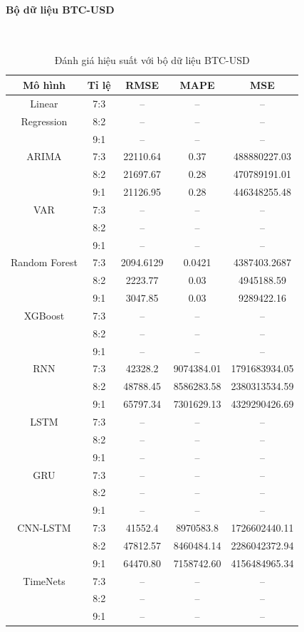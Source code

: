 \documentclass[conference]{IEEEtran}
\begin{document}
\paragraph{\textbf{Bộ dữ liệu BTC-USD}} \mbox{} \\
\begin{table}[H]
	\centering
	\caption{Đánh giá hiệu suất với bộ dữ liệu BTC-USD}
	\begin{tabular}{|c|c|c|c|c|}
		\hline
		Mô hình & Tỉ lệ & RMSE & MAPE & MSE \\ \hline
		Linear & 7:3 & -- & -- & -- \\
		Regression & 8:2 & -- & -- & -- \\
		& 9:1 & -- & -- & -- \\ \hline
		ARIMA & 7:3 & 22110.64 & 0.37 & 488880227.03 \\
		& 8:2 & 21697.67 & 0.28 & 470789191.01 \\
		& 9:1 & 21126.95 & 0.28 & 446348255.48 \\ \hline
		VAR & 7:3 & -- & -- & -- \\
		& 8:2 & -- & -- & -- \\
		& 9:1 & -- & -- & -- \\ \hline
		Random Forest & 7:3 & 2094.6129 & 0.0421 & 4387403.2687 \\
		& 8:2 & 2223.77 & 0.03 & 4945188.59 \\
		& 9:1 & 3047.85 & 0.03 & 9289422.16 \\ \hline
		XGBoost & 7:3 & -- & -- & -- \\
		& 8:2 & -- & -- & -- \\
		& 9:1 & -- & -- & -- \\ \hline
		RNN & 7:3 & 42328.2 & 9074384.01 & 1791683934.05 \\
		& 8:2 & 48788.45 & 8586283.58 & 2380313534.59 \\
		& 9:1 & 65797.34 & 7301629.13 & 4329290426.69 \\ \hline
		LSTM & 7:3 & -- & -- & -- \\
		& 8:2 & -- & -- & -- \\
		& 9:1 & -- & -- & -- \\ \hline
		GRU & 7:3 & -- & -- & -- \\
		& 8:2 & -- & -- & -- \\
		& 9:1 & -- & -- & -- \\ \hline
		CNN-LSTM & 7:3 & 41552.4 & 8970583.8 & 1726602440.11 \\
		& 8:2 & 47812.57 & 8460484.14 & 2286042372.94 \\
		& 9:1 & 64470.80 & 7158742.60 & 4156484965.34 \\ \hline
		TimeNets & 7:3 & -- & -- & -- \\
		& 8:2 & -- & -- & -- \\
		& 9:1 & -- & -- & -- \\ \hline
	\end{tabular}
\end{table}
\end{document}

